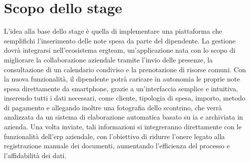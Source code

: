 \section{Scopo dello stage}
\noindent L'idea alla base dello stage è quella di implementare una piattaforma che semplifichi l'inserimento delle note spesa da parte del dipendente. La gestione dovrà integrarsi nell'ecosistema \gls{ergteam}, un'applicazione nata con lo scopo di migliorare la collaborazione aziendale tramite l'invio delle presenze, la consultazione di un calendario condiviso e la prenotazione di risorse comuni. \newline
Con la nuova funzionalità, il dipendente potrà caricare in autonomia le proprie note spesa direttamente da smartphone, grazie a un'interfaccia semplice e intuitiva, inserendo tutti i dati necessari, come cliente, tipologia di spesa, importo, metodo di pagamento e allegando inoltre una fotografia dello scontrino, che verrà analizzata da un sistema di elaborazione automatica basato su \gls{ia} e archiviata in azienda. Una volta inviate, tali informazioni si integreranno direttamente con le funzionalità dell'\gls{erp} aziendale, con l'obiettivo di ridurre l'onere legato alla registrazione manuale dei documenti, aumentando l'efficienza del processo e l'affidabilità dei dati.


